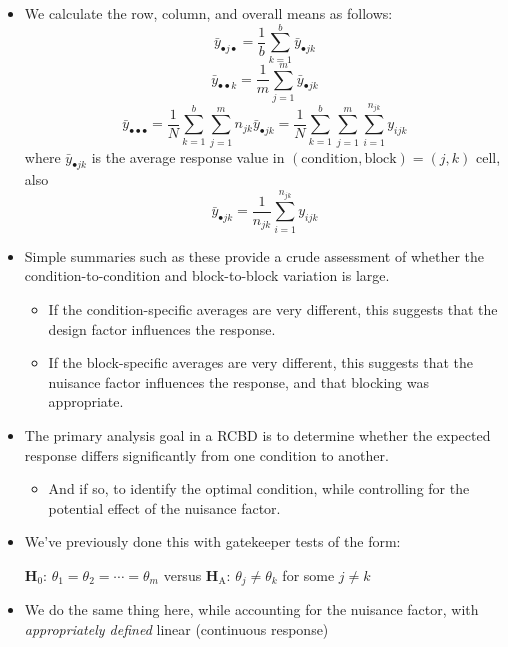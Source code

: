 \begin{itemize}
\begin{itemize}
            \end{itemize}
      \item We calculate the row, column, and overall means as follows:
            \[ \bar{y}_{\bullet j\bullet}=\frac{1}{b} \sum_{k=1}^{b} \bar{y}_{\bullet jk} \]
            \[ \bar{y}_{\bullet\bullet k}=\frac{1}{m} \sum_{j=1}^{m} \bar{y}_{\bullet jk} \]
            \[ \bar{y}_{\bullet\bullet\bullet}=\frac{1}{N} \sum_{k=1}^{b} \sum_{j=1}^{m} n_{jk}\bar{y}_{\bullet jk}=\frac{1}{N} \sum_{k=1}^{b} \sum_{j=1}^{m} \sum_{i=1}^{n_{jk}} y_{ijk} \]
            where $ \bar{y}_{\bullet jk} $ is the average response value in $  (\text{condition}, \text{block}) = (j, k) $ cell, also
            \[ \bar{y}_{\bullet jk}=\frac{1}{n_{jk}} \sum_{i=1}^{n_{jk}} y_{ijk} \]
      \item Simple summaries such as these provide a crude assessment of whether the condition-to-condition and
            block-to-block variation is large.
            \begin{itemize}
                  \item If the condition-specific averages are very different, this suggests that the design factor influences the response.
                  \item If the block-specific averages are very different, this suggests that the nuisance factor influences the response, and that blocking was appropriate.
            \end{itemize}
      \item The primary analysis goal in a RCBD is to determine whether the expected response differs significantly
            from one condition to another.
            \begin{itemize}
                  \item And if so, to identify the optimal condition, while controlling for the potential effect of the nuisance factor.
            \end{itemize}
      \item We've previously done this with gatekeeper tests of the form:
            \begin{tightcenter}
                  $ \mathbf{H}_0 $: $ \theta_1=\theta_2=\cdots=\theta_m $ versus $ \mathbf{H}_\text{A} $: $ \theta_j\ne \theta_k $ for some $ j\ne k $
            \end{tightcenter}
      \item We do the same thing here, while accounting for the nuisance factor, with \emph{appropriately defined} linear (continuous response)

\end{itemize}
